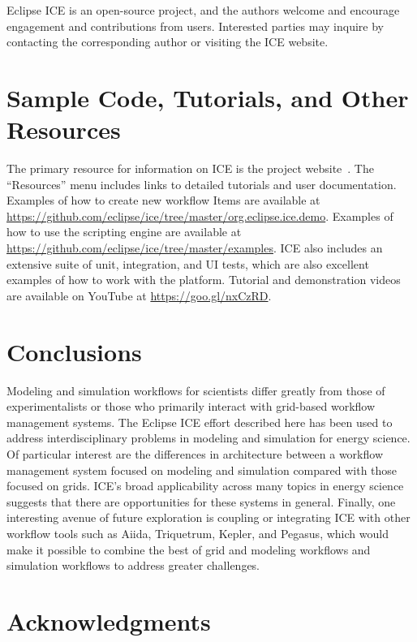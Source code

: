 Eclipse ICE is an open-source project, and the authors welcome and encourage
engagement and contributions from users. Interested parties may inquire by
contacting the corresponding author or visiting the ICE website.

\section{Sample Code, Tutorials, and Other
Resources}\label{sample-code-tutorials-and-other-resources}

The primary resource for information on ICE is the project 
website~\cite{billings_eclipse_2016}. The ``Resources'' menu includes links to
detailed tutorials and user documentation. Examples of how to create
new workflow Items are available at
\url{https://github.com/eclipse/ice/tree/master/org.eclipse.ice.demo}.
Examples of how to use the scripting engine are available at
\url{https://github.com/eclipse/ice/tree/master/examples}. ICE also includes an
extensive suite of unit, integration, and UI tests, which are
also excellent examples of how to work with the platform. Tutorial and demonstration videos are available on YouTube at \url{https://goo.gl/nxCzRD}.

\section{Conclusions}\label{conclusions}

Modeling and simulation workflows for scientists differ
greatly from those of experimentalists or those who primarily interact with
grid-based workflow management systems. The Eclipse ICE effort described here 
has been used to address interdisciplinary problems in 
modeling and simulation for energy science. Of particular interest are the
differences in architecture between a workflow management system focused
on modeling and simulation compared with those focused on grids. ICE's broad
applicability across many topics in energy science suggests that
there are opportunities for these systems in general. Finally, one 
interesting avenue of future exploration is coupling or integrating ICE 
with other workflow tools such as Aiida, Triquetrum, Kepler, and Pegasus,
which would make it possible to combine the best of grid and modeling workflows and
simulation workflows to address greater challenges.

\section*{Acknowledgments}\label{acknowledgments}

